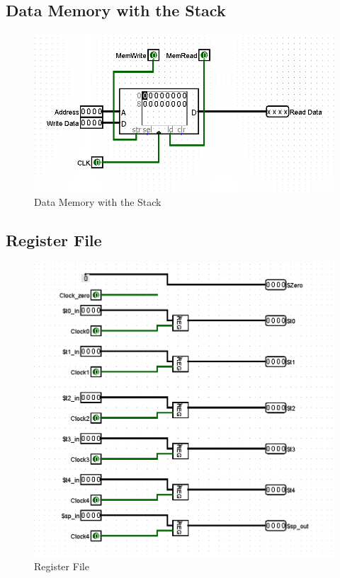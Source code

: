 \documentclass[a4paper]{article}
\begin{document}
\subsection{Data Memory with the Stack}
\vspace{0.5cm}
\begin{figure}[H]
    \centering
    \includegraphics[width=1\linewidth]{dataMemWStack.png}
    \caption{Data Memory with the Stack} 
\end{figure}
\vspace{0.5cm}
\subsection{Register File}
\vspace{0.5cm}
\begin{figure}[H]
    \centering
    \includegraphics[height = 15 cm, width=1.2\linewidth]{registerFile.png}
    \caption{Register File} 
\end{figure}
\vspace{0.5cm}
\end{document}
